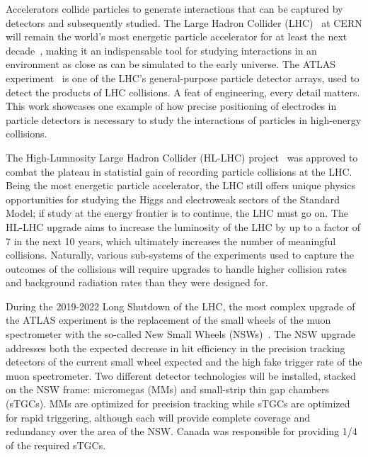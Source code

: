 Accelerators collide particles to generate interactions that can be captured by detectors and subsequently studied. The Large Hadron Collider (LHC)~\cite{evans_lhc_2008} at CERN will remain the world's most energetic particle accelerator for at least the next decade~\cite{hl_lhc_tdr}, making it an indispensable tool for studying interactions in an environment as close as can be simulated to the early universe. The ATLAS experiment~\cite{collaboration_atlas_2008} is one of the LHC's general-purpose particle detector arrays, used to detect the products of LHC collisions. A feat of engineering, every detail matters. This work showcases one example of how precise positioning of electrodes in particle detectors is necessary to study the interactions of particles in high-energy collisions.

The High-Lumnosity Large Hadron Collider (HL-LHC) project~\cite{hl_lhc_tdr} was approved to combat the plateau in statistial gain of recording particle collisions at the LHC. Being the most energetic particle accelerator, the LHC still offers unique physics opportunities for studying the Higgs and electroweak sectors of the Standard Model\cite{dainese_physics_2018}; if study at the energy frontier is to continue, the LHC must go on. The HL-LHC upgrade aims to increase the luminosity of the LHC by up to a factor of 7 in the next 10 years, which ultimately increases the number of meaningful collisions. Naturally, various sub-systems of the experiments used to capture the outcomes of the collisions will require upgrades to handle higher collision rates and background radiation rates than they were designed for. 

During the 2019-2022 Long Shutdown of the LHC, the most complex upgrade of the ATLAS experiment is the replacement of the small wheels of the muon spectrometer with the so-called New Small Wheels (NSWs)~\cite{nsw_tdr}. The NSW upgrade addresses both the expected decrease in hit efficiency in the precision tracking detectors of the current small wheel expected and the high fake trigger rate of the muon spectrometer. Two different detector technologies will be installed, stacked on the NSW frame: micromegas (MMs) and small-strip thin gap chambers (sTGCs). MMs are optimized for precision tracking while sTGCs are optimized for rapid triggering, although each will provide complete coverage and redundancy over the area of the NSW. Canada was responsible for providing 1/4 of the required sTGCs.

